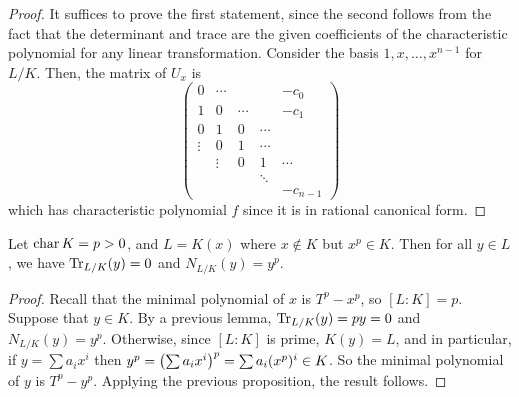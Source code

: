 \begin{proof}
	It suffices to prove the first statement, since the second follows from the fact that the determinant and trace are the given coefficients of the characteristic polynomial for any linear transformation.
	Consider the basis \( 1, x, \dots, x^{n-1} \) for \( L / K \).
	Then, the matrix of \( U_x \) is
	\[ \begin{pmatrix}
		0 & \cdots & & & -c_0 \\
		1 & 0 & \cdots & & -c_1 \\
		0 & 1 & 0 & \cdots \\
		\vdots & 0 & 1 & \cdots \\
		& \vdots & 0 & 1 & \cdots \\
		& & & \ddots \\
		& & & & -c_{n-1}
	\end{pmatrix} \]
	which has characteristic polynomial \( f \) since it is in rational canonical form.
\end{proof}
\begin{corollary}
	Let \( \operatorname{char} K = p > 0 \), and \( L = K(x) \) where \( x \not\in K \) but \( x^p \in K \).
	Then for all \( y \in L \), we have \( \Tr_{L/K}(y) = 0 \) and \( N_{L/K}(y) = y^p \).
\end{corollary}
\begin{proof}
	Recall that the minimal polynomial of \( x \) is \( T^p - x^p \), so \( [L : K] = p \).
	Suppose that \( y \in K \).
	By a previous lemma, \( \Tr_{L/K}(y) = py = 0 \) and \( N_{L/K}(y) = y^p \).
	Otherwise, since \( [L:K] \) is prime, \( K(y) = L \), and in particular, if \( y = \sum a_i x^i \) then \( y^p = \qty(\sum a_i x^i)^p = \sum a_i (x^p)^i \in K \).
	So the minimal polynomial of \( y \) is \( T^p - y^p \).
	Applying the previous proposition, the result follows.
\end{proof}

